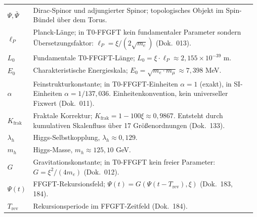 \begin{longtable}{lp{9.5cm}}
$\Psi, \bar{\Psi}$ & Dirac-Spinor und adjungierter Spinor;
        topologisches Objekt im Spin-Bündel über dem Torus. \\[4pt]
$\ell_P$ & Planck-Länge; in T0-FFGFT kein fundamentaler Parameter
        sondern Übersetzungsfaktor:
        $\ell_P = \xi/(2\sqrt{m_e})$ (Dok.~013). \\[4pt]
$L_0$ & Fundamentale T0-FFGFT-Länge;
        $L_0 = \xi \cdot \ell_P \approx 2{,}155 \times 10^{-39}$ m. \\[4pt]
$E_0$ & Charakteristische Energieskala;
        $E_0 = \sqrt{m_e \cdot m_\mu} \approx 7{,}398$ MeV. \\[4pt]
$\alpha$ & Feinstrukturkonstante; in T0-FFGFT-Einheiten $\alpha = 1$
        (exakt), in SI-Einheiten $\alpha = 1/137{,}036$.
        Einheitenkonvention, kein universeller Fixwert (Dok.~011). \\[4pt]
$K_{\text{frak}}$ & Fraktale Korrektur;
        $K_{\text{frak}} = 1 - 100\xi \approx 0{,}9867$.
        Entsteht durch kumulativen Skalenfluss über 17 Größenordnungen
        (Dok.~133). \\[4pt]
$\lambda_h$ & Higgs-Selbstkopplung, $\lambda_h \approx 0{,}129$. \\[4pt]
$m_h$ & Higgs-Masse, $m_h \approx 125{,}10$ GeV. \\[4pt]
$G$ & Gravitationskonstante; in T0-FFGFT kein freier Parameter:
        $G = \xi^2/(4m_e)$ (Dok.~012). \\[4pt]
$\Psi(t)$ & FFGFT-Rekursionsfeld;
        $\Psi(t) = G(\Psi(t-T_{\mathrm{rev}}), \xi)$ (Dok.~183, 184). \\[4pt]
$T_{\mathrm{rev}}$ & Rekursionsperiode im FFGFT-Zeitfeld (Dok.~184). \\
\bottomrule
\end{longtable}

